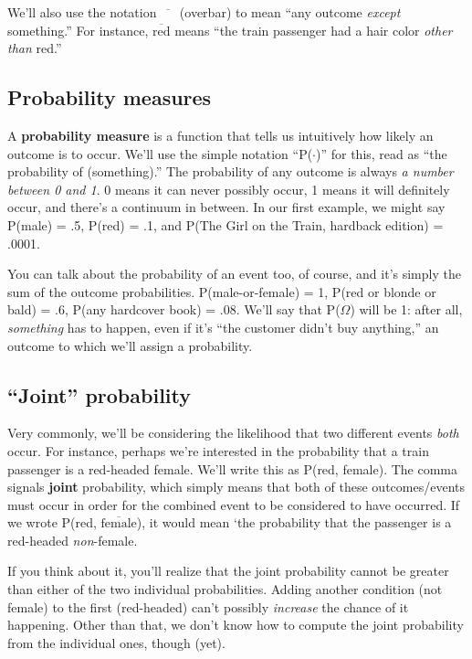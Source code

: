 We'll also use the notation $\overline{\phantom{xx}}$ (overbar) to mean ``any
outcome \textit{except} something.'' For instance, $\overline{\textrm{red}}$
means ``the train passenger had a hair color \textit{other than} red.''

\subsection{Probability measures}

A \textbf{probability measure} is a function that tells us intuitively how
likely an outcome is to occur. We'll use the simple notation ``P($\cdot$)'' for
this, read as ``the probability of (something).'' The probability of any
outcome is always \textit{a number between 0 and 1}. 0 means it can never
possibly occur, 1 means it will definitely occur, and there's a continuum in
between. In our first example, we might say P(male) = .5, P(red) = .1, and
P(The Girl on the Train, hardback edition) = .0001.

You can talk about the probability of an event too, of course, and it's simply
the sum of the outcome probabilities. P(male-or-female) = 1, P(red or blonde
or bald) = .6, P(any hardcover book) = .08. We'll say that P($\Omega$) will be
1: after all, \textit{something} has to happen, even if it's ``the customer
didn't buy anything,'' an outcome to which we'll assign a probability.

\subsection{``Joint'' probability}

Very commonly, we'll be considering the likelihood that two different events
\textit{both} occur. For instance, perhaps we're interested in the probability
that a train passenger is a red-headed female. We'll write this as P(red,
female). The comma signals \textbf{joint} probability, which simply means that
both of these outcomes/events must occur in order for the combined event to be
considered to have occurred. If we wrote P(red, $\overline{\textrm{female}}$),
it would mean `the probability that the passenger is a red-headed
\textit{non}-female.

If you think about it, you'll realize that the joint probability cannot be
greater than either of the two individual probabilities. Adding another
condition (not female) to the first (red-headed) can't possibly
\textit{increase} the chance of it happening. Other than that, we don't know
how to compute the joint probability from the individual ones, though (yet).

